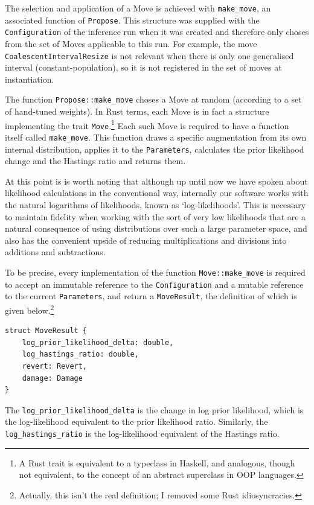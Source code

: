 \documentclass[10pt,journal,compsoc]{IEEEtran}
\begin{document}
The selection and application of a Move is achieved with \texttt{make\_move}, an associated function of \texttt{Propose}. This structure was supplied with the \texttt{Configuration} of the inference run when it was created and therefore only choses from the set of Moves applicable to this run. For example, the move \texttt{CoalescentIntervalResize} is not relevant when there is only one generalised interval (constant-population), so it is not registered in the set of moves at instantiation.

The function \texttt{Propose::make\_move} choses a Move at random (according to a set of hand-tuned weights). In Rust terms, each Move is in fact a structure implementing the trait \texttt{Move}.\footnote{A Rust trait is equivalent to a typeclass in Haskell, and analogous, though not equivalent, to the concept of an abstract superclass in OOP languages.} Each such Move is required to have a function itself called \texttt{make\_move}. This function draws a specific augmentation from its own internal distribution, applies it to the \texttt{Parameters}, calculates the prior likelihood change and the Hastings ratio and returns them.

At this point is is worth noting that although up until now we have spoken about likelihood calculations in the conventional way, internally our software works with the natural logarithms of likelihoods, known as `log-likelihoods'. This is necessary to maintain fidelity when working with the sort of very low likelihoods that are a natural consequence of using distributions over such a large parameter space, and also has the convenient upside of reducing multiplications and divisions into additions and subtractions.

To be precise, every implementation of the function \texttt{Move::make\_move} is required to accept an immutable reference to the \texttt{Configuration} and a mutable reference to the current \texttt{Parameters}, and return a \texttt{MoveResult}, the definition of which is given below.\footnote{Actually, this isn't the real definition; I removed some Rust idiosyncracies.}

\begin{verbatim}
struct MoveResult {
    log_prior_likelihood_delta: double,
    log_hastings_ratio: double,
    revert: Revert,
    damage: Damage
}
\end{verbatim}

The \texttt{log\_prior\_likelihood\_delta} is the change in log prior likelihood, which is the log-likelihood equivalent to the prior likelihood ratio. Similarly, the \texttt{log\_hastings\_ratio} is the log-likelihood equivalent of the Hastings ratio.
\end{document}
